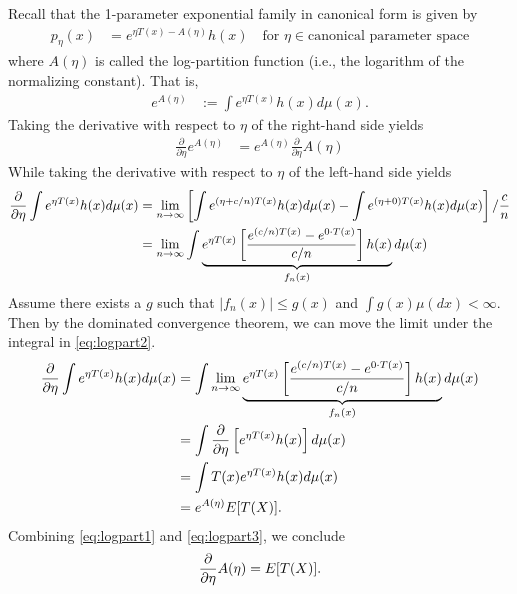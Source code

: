 \documentclass[twoside]{article}
\begin{document}
\begin{example}
Recall that the 1-parameter exponential family in canonical form is given by
\begin{align*}
  p_\eta(x) &= e^{\eta T(x) - A(\eta)} h(x) \quad \text{for }
  \eta \in \text{canonical parameter space}
\end{align*}
where $A(\eta)$ is called the log-partition function (i.e., the
logarithm of the normalizing constant).  That is,
\begin{align*}
  e^{A(\eta)} &:= \int e^{\eta T(x)} h(x) d\mu(x).
\end{align*}
Taking the derivative with respect to $\eta$ of the right-hand side yields
\begin{align}\label{eq:logpart1}
  \frac{\partial}{\partial \eta} e^{A(\eta)} &= e^{A(\eta)}
    \frac{\partial}{\partial \eta}A(\eta)
\end{align}
While taking the derivative with respect to $\eta$ of the left-hand side
yields
\begin{align}
  \frac{\partial}{\partial \eta} \int e^{\eta T(x)} h(x) d\mu(x)
  &= \lim_{n \rightarrow \infty} \left[ \int e^{(\eta + c/n)T(x)} h(x) d\mu(x) -
  \int e^{(\eta + 0)T(x)} h(x) d\mu(x) \right]/ \frac{c}{n} \notag\\
  &= \lim_{n \rightarrow \infty} \int \underbrace{e^{\eta T(x)} \left[
  \frac{e^{(c/n)T(x)} - e^{0 \cdot T(x)}}{c/n} \right] h(x)}_{f_n(x)} d\mu(x) \label{eq:logpart2}
\end{align}
Assume there exists a $g$ such that $|f_n(x)| \le g(x)$ and
$\int g(x) \mu(dx) < \infty$.  Then by the dominated convergence theorem, we
can move the limit under the integral in \eqref{eq:logpart2}.
\begin{align}
   \frac{\partial}{\partial \eta} \int e^{\eta T(x)} h(x) d\mu(x)
  &=  \int \lim_{n \rightarrow \infty}\underbrace{e^{\eta T(x)} \left[
  \frac{e^{(c/n)T(x)} - e^{0 \cdot T(x)}}{c/n} \right] h(x)}_{f_n(x)} d\mu(x) \notag\\
  &= \int \frac{\partial}{\partial \eta} \left[e^{\eta T(x)} h(x)\right]  d\mu(x) \notag\\
  &= \int T(x) e^{\eta T(x)} h(x) d\mu(x)  \notag\\
  &= e^{A(\eta)} E[T(X)]. \label{eq:logpart3}
\end{align}
Combining \eqref{eq:logpart1} and \eqref{eq:logpart3}, we conclude
\begin{align*}
\frac{\partial}{\partial \eta} A(\eta) = E[T(X)].
\end{align*}
\end{example}




\end{document}
